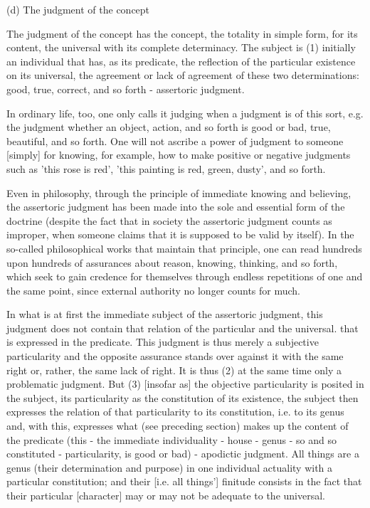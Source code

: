 (d) The judgment of the concept

The judgment of the concept has the concept, the totality in simple form,
for its content, the universal with its complete determinacy.
The subject is (1) initially an individual that has, as its predicate,
the reflection of the particular existence on its universal,
the agreement or lack of agreement of these two determinations:
good, true, correct, and so forth - assertoric judgment.

In ordinary life, too, one only calls it judging when a judgment is of
this sort, e.g. the judgment whether an object, action, and so forth is
good or bad, true, beautiful, and so forth. One will not ascribe a
power of judgment to someone [simply] for knowing, for example,
how to make positive or negative judgments such as 'this rose is red',
'this painting is red, green, dusty', and so forth.

Even in philosophy, through the principle of immediate knowing
and believing, the assertoric judgment has been made into the sole
and essential form of the doctrine (despite the fact that in society the
assertoric judgment counts as improper, when someone claims that
it is supposed to be valid by itself). In the so-called philosophical
works that maintain that principle, one can read hundreds upon
hundreds of assurances about reason, knowing, thinking,
and so forth, which seek to gain credence for themselves through
endless repetitions of one and the same point, since external
authority no longer counts for much.

In what is at first the immediate subject of the assertoric judgment,
this judgment does not contain that
relation of the particular and the universal.
that is expressed in the predicate.
This judgment is thus merely a subjective particularity and
the opposite assurance stands over against it with the
same right or, rather, the same lack of right.
It is thus (2) at the same time only a problematic judgment.
But (3) [insofar as] the objective particularity is posited in the subject,
its particularity as the constitution of its existence,
the subject then expresses the relation of that particularity to its constitution,
i.e. to its genus and, with this, expresses what (see preceding section)
makes up the content of the predicate
(this - the immediate individuality - house - genus - so and so constituted - particularity,
is good or bad) - apodictic judgment.
All things are a genus (their determination and purpose)
in one individual actuality with a particular constitution;
and their [i.e. all things'] finitude consists in the fact that
their particular [character] may or may not be adequate to the universal.

